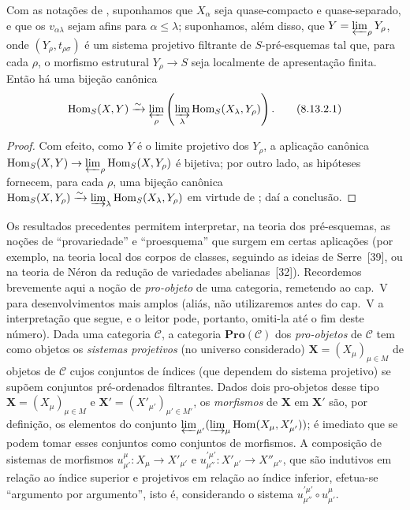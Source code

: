 \begin{corollary}[8.13.2]
\label{IV.8.13.2}
Com as notações de , suponhamos que $X_\alpha$ seja quase-compacto e quase-separado, e que os $v_{\alpha\lambda}$ sejam afins para $\alpha\leqslant\lambda$; suponhamos, além disso, que $Y=\varprojlim_\rho Y_\rho$, onde $(Y_\rho,t_{\rho\sigma})$ é um sistema projetivo filtrante de $S$-pré-esquemas tal que, para cada $\rho$, o morfismo estrutural $Y_\rho\to S$ seja localmente de apresentação finita.
Então há uma bijeção canônica
\begin{equation}
\label{IV.8.13.2.1}
\operatorname{Hom}_S(X,Y)\xrightarrow{\sim}\varprojlim_\rho\left(\varinjlim_\lambda\operatorname{Hom}_S(X_\lambda,Y_\rho)\right). \tag{8.13.2.1}
\end{equation}
\end{corollary}

\begin{proof}
Com efeito, como $Y$ é o limite projetivo dos $Y_\rho$, a aplicação canônica $\operatorname{Hom}_S(X,Y)\to\varprojlim_\rho\operatorname{Hom}_S(X,Y_\rho)$ é bijetiva; por outro lado, as hipóteses fornecem, para cada $\rho$, uma bijeção canônica $\operatorname{Hom}_S(X,Y_\rho)\xrightarrow{\sim}\varinjlim_\lambda\operatorname{Hom}_S(X_\lambda,Y_\rho)$ em virtude de ; daí a conclusão.
\end{proof}

\begin{env}[8.13.3]
\label{IV.8.13.3}
Os resultados precedentes permitem interpretar, na teoria dos pré-esquemas, as noções de ``provariedade'' e ``proesquema'' que surgem em certas aplicações (por exemplo, na teoria local dos corpos de classes, seguindo as ideias de Serre~[39], ou na teoria de N\'eron da redução de
variedades abelianas~[32]).
Recordemos brevemente aqui a noção de \emph{pro-objeto} de uma categoria, remetendo ao cap.~V para desenvolvimentos mais amplos (aliás, não utilizaremos antes do cap.~V a interpretação que segue, e o leitor pode, portanto, omiti-la até o fim deste número).
Dada uma categoria $\mathcal{C}$, a categoria $\mathbf{Pro}(\mathcal{C})$ dos \emph{pro-objetos} de $\mathcal{C}$ tem como objetos os \emph{sistemas projetivos} (no universo considerado) $\mathbf{X}=(X_\mu)_{\mu\in M}$ de objetos de $\mathcal{C}$ cujos conjuntos de índices (que dependem do sistema projetivo) se supõem conjuntos pré-ordenados filtrantes.
Dados dois pro-objetos desse tipo $\mathbf{X}=(X_\mu)_{\mu\in M}$ e $\mathbf{X}'=(X'_{\mu'})_{\mu'\in M'}$, os \emph{morfismos} de $\mathbf{X}$ em $\mathbf{X}'$ são, por definição, os elementos do conjunto $\varprojlim_{\mu'}(\varinjlim_\mu\operatorname{Hom}(X_\mu,X'_{\mu'}))$; é imediato que se podem tomar esses conjuntos como conjuntos de morfismos. A composição de sistemas de morfismos $u_{\mu'}^\mu:X_\mu\to X'_{\mu'}$ e $u_{\mu''}^{\prime\mu'}:X'_{\mu'}\to X''_{\mu''}$, que são indutivos em relação ao índice superior e projetivos em relação ao índice inferior, efetua-se ``argumento por argumento'', isto é, considerando o sistema $u_{\mu''}^{\prime\mu'}\circ u_{\mu'}^\mu$.
\end{env}

